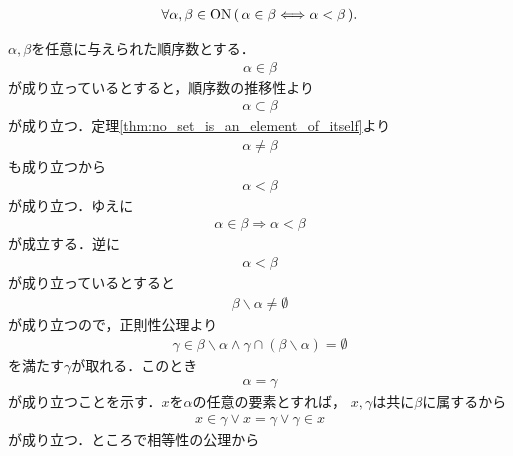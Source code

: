 	\begin{screen}
		\begin{thm}
		\label{thm:element_and_proper_subset_correspond_between_ordinal_numbers}
			\begin{align}
				\forall \alpha,\beta \in \mathrm{ON}\,
				(\, \alpha \in \beta \Longleftrightarrow \alpha < \beta\, ).
			\end{align}
		\end{thm}
	\end{screen}
	
	\begin{prf}
		$\alpha,\beta$を任意に与えられた順序数とする．
		\begin{align}
			\alpha \in \beta
		\end{align}
		が成り立っているとすると，順序数の推移性より
		\begin{align}
			\alpha \subset \beta
		\end{align}
		が成り立つ．定理\ref{thm:no_set_is_an_element_of_itself}より
		\begin{align}
			\alpha \neq \beta
		\end{align}
		も成り立つから
		\begin{align}
			\alpha < \beta
		\end{align}
		が成り立つ．ゆえに
		\begin{align}
			\alpha \in \beta \Longrightarrow \alpha < \beta
		\end{align}
		が成立する．逆に
		\begin{align}
			\alpha < \beta
		\end{align}
		が成り立っているとすると
		\begin{align}
			\beta \backslash \alpha \neq \emptyset
		\end{align}
		が成り立つので，正則性公理より
		\begin{align}
			\gamma \in \beta \backslash \alpha \wedge \gamma \cap (\beta \backslash \alpha) = \emptyset
		\end{align}
		を満たす$\gamma$が取れる．このとき
		\begin{align}
			\alpha = \gamma
		\end{align}
		が成り立つことを示す．$x$を$\alpha$の任意の要素とすれば，
		$x,\gamma$は共に$\beta$に属するから
		\begin{align}
			x \in \gamma \vee x = \gamma \vee \gamma \in x
			\label{eq:thm_element_and_proper_subset_correspond_between_ordinal_numbers_1}
		\end{align}
		が成り立つ．ところで相等性の公理から

\end{prf}
